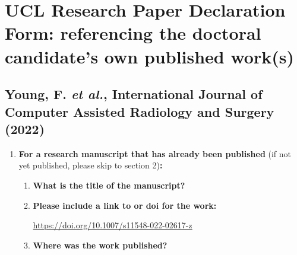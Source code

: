 %
%
% 
{\sffamily\footnotesize{}
\chapter*{UCL Research Paper Declaration Form: referencing the doctoral candidate’s own published work(s)}
\section*{Young, F. \textit{et al.}, International Journal of Computer Assisted Radiology and Surgery (2022)}

	\begin{enumerate}[leftmargin=*,label={\bfseries\arabic*.}]\itemsep0em
		\item \textbf{For a research manuscript that has already been published} (if not yet published, please skip to section 2)\textbf{:}
		\begin{enumerate}[label={\alph*)}]\itemsep0em
		\item \textbf{What is the title of the manuscript?}


		\item \textbf{Please include a link to or doi for the work:}

		\url{https://doi.org/10.1007/s11548-022-02617-z}

		\item \textbf{Where was the work published?}



\end{enumerate}
\end{enumerate}}
